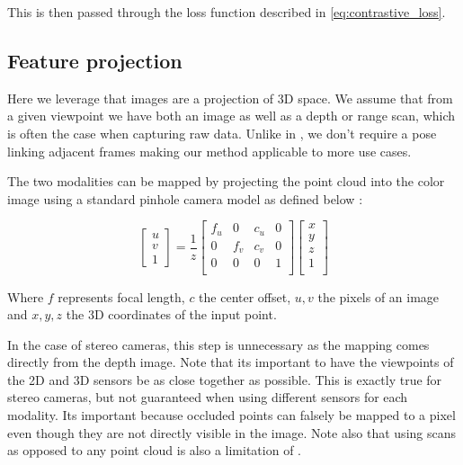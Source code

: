 \documentclass[10pt,twocolumn,letterpaper]{article}
\newcommand{\AJ}[1]{{\color{red}{[Andrej: #1]}}}
\begin{document}
\AJ{Add Kd-tree mapping to get the correct pixels after transformation.}

This is then passed through the loss function described in \ref{eq:contrastive_loss}.

\subsection{Feature projection}
\label{sec:featureProjection}

Here we leverage that images are a projection of 3D space. We assume that from a given viewpoint we have both an image as well as a depth or range scan, which is often the case when capturing raw data. Unlike in \cite{xie2020pointcontrast}, we don't require a pose linking adjacent frames making our method applicable to more use cases.

The two modalities can be mapped by projecting the point cloud into the color image using a standard pinhole camera model as defined below \cite{?}:

\begin{equation}
    \begin{bmatrix}
        u \\
        v \\
        1
    \end{bmatrix} = \frac{1}{z}
    \begin{bmatrix}
        f_u & 0   & c_u & 0 \\
        0   & f_v & c_v & 0 \\
        0   & 0   & 0   & 1 \\
    \end{bmatrix}
    \begin{bmatrix}
        x \\
        y \\
        z \\
        1 \\
    \end{bmatrix}
    \label{eq:pinhole}
\end{equation}

\AJ{Is this equation necessary or is this considered common knowledge}

Where $f$ represents focal length, $c$ the center offset, $u,v$ the pixels of an image and $x,y,z$ the 3D coordinates of the input point.

In the case of stereo cameras, this step is unnecessary as the mapping comes directly from the depth image. Note that its important to have the viewpoints of the 2D and 3D sensors be as close together as possible. This is exactly true for stereo cameras, but not guaranteed when using different sensors for each modality. Its important because occluded points can falsely be mapped to a pixel even though they are not directly visible in the image. Note also that using scans as opposed to any point cloud is also a limitation of \cite{xie2020pointcontrast}.
\end{document}

